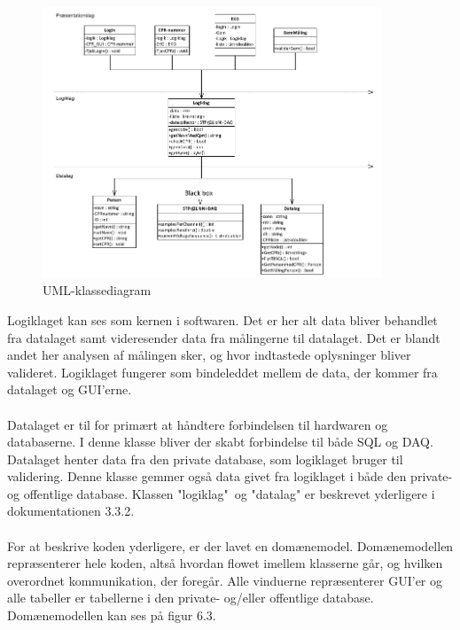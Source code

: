 \begin{figure}[H]
	\centering
	\includegraphics[width=0.9\textwidth]{Figurer/Snip20150512_9}
	\caption{UML-klassediagram}
\end{figure}
 
Logiklaget kan ses som kernen i softwaren. Det er her alt data bliver behandlet fra datalaget samt videresender data fra målingerne til datalaget. Det er blandt andet her analysen af målingen sker, og hvor indtastede oplysninger bliver valideret. Logiklaget fungerer som bindeleddet mellem de data, der kommer fra datalaget og GUI’erne. \\ \\
Datalaget er til for primært at håndtere forbindelsen til hardwaren og databaserne. I denne klasse bliver der skabt forbindelse til både SQL og DAQ. Datalaget henter data fra den private database, som logiklaget bruger til validering. Denne klasse gemmer også data givet fra logiklaget i både den private- og offentlige database. Klassen "logiklag"\  og "datalag" er beskrevet yderligere i dokumentationen 3.3.2. \\ \\
For at beskrive koden yderligere, er der lavet en domænemodel. Domænemodellen repræsenterer hele koden, altså hvordan flowet imellem klasserne går, og hvilken overordnet kommunikation, der foregår. Alle vinduerne repræsenterer GUI’er og alle tabeller er tabellerne i den private- og/eller offentlige database. Domænemodellen kan ses på figur 6.3. 

